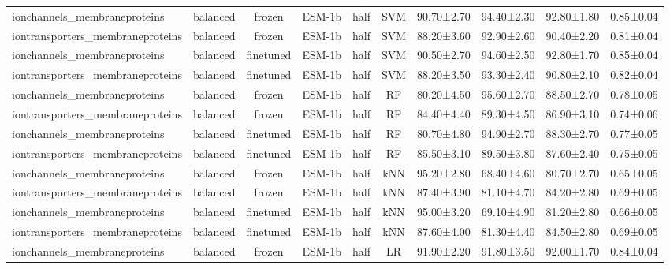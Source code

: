 \begin{tabular}{lcccccc}
    ionchannels\_membraneproteins &   balanced &         frozen &       ESM-1b &      half &        SVM &  90.70±2.70 &  94.40±2.30 &  92.80±1.80 & 0.85±0.04 \\
iontransporters\_membraneproteins &   balanced &         frozen &       ESM-1b &      half &        SVM &  88.20±3.60 &  92.90±2.60 &  90.40±2.20 & 0.81±0.04 \\
    ionchannels\_membraneproteins &   balanced &      finetuned &       ESM-1b &      half &        SVM &  90.50±2.70 &  94.60±2.50 &  92.80±1.70 & 0.85±0.04 \\
iontransporters\_membraneproteins &   balanced &      finetuned &       ESM-1b &      half &        SVM &  88.20±3.50 &  93.30±2.40 &  90.80±2.10 & 0.82±0.04 \\
    ionchannels\_membraneproteins &   balanced &         frozen &       ESM-1b &      half &         RF &  80.20±4.50 &  95.60±2.70 &  88.50±2.70 & 0.78±0.05 \\
iontransporters\_membraneproteins &   balanced &         frozen &       ESM-1b &      half &         RF &  84.40±4.40 &  89.30±4.50 &  86.90±3.10 & 0.74±0.06 \\
    ionchannels\_membraneproteins &   balanced &      finetuned &       ESM-1b &      half &         RF &  80.70±4.80 &  94.90±2.70 &  88.30±2.70 & 0.77±0.05 \\
iontransporters\_membraneproteins &   balanced &      finetuned &       ESM-1b &      half &         RF &  85.50±3.10 &  89.50±3.80 &  87.60±2.40 & 0.75±0.05 \\
    ionchannels\_membraneproteins &   balanced &         frozen &       ESM-1b &      half &        kNN &  95.20±2.80 &  68.40±4.60 &  80.70±2.70 & 0.65±0.05 \\
iontransporters\_membraneproteins &   balanced &         frozen &       ESM-1b &      half &        kNN &  87.40±3.90 &  81.10±4.70 &  84.20±2.80 & 0.69±0.05 \\
    ionchannels\_membraneproteins &   balanced &      finetuned &       ESM-1b &      half &        kNN &  95.00±3.20 &  69.10±4.90 &  81.20±2.80 & 0.66±0.05 \\
iontransporters\_membraneproteins &   balanced &      finetuned &       ESM-1b &      half &        kNN &  87.60±4.00 &  81.30±4.40 &  84.50±2.80 & 0.69±0.05 \\
    ionchannels\_membraneproteins &   balanced &         frozen &       ESM-1b &      half &         LR &  91.90±2.20 &  91.80±3.50 &  92.00±1.70 & 0.84±0.04 \\

\end{tabular}
